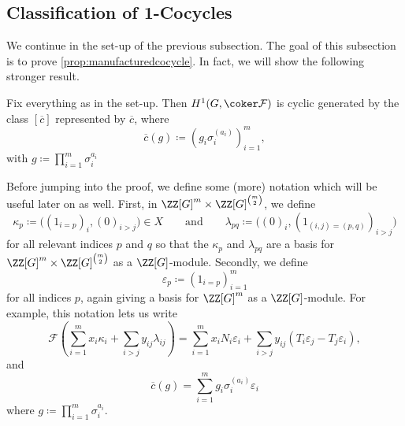 \documentclass{article}
\numberwithin{equation}{section}
\begin{document}
\subsection{Classification of 1-Cocycles}
We continue in the set-up of the previous subsection. The goal of this subsection is to prove \autoref{prop:manufacturedcocycle}. In fact, we will show the following stronger result.
\begin{proposition} \label{prop:allmanufacturedcocycles}
	Fix everything as in the set-up. Then $H^1(G,\coker\mathcal F)$ is cyclic generated by the class $[\overline c]$ represented by $\overline c$, where
	\[\overline c(g)\coloneqq\left(g_i\sigma_i^{(a_i)}\right)_{i=1}^m,\]
	with $g\coloneqq\prod_{i=1}^m\sigma_i^{a_i}$
\end{proposition}
Before jumping into the proof, we define some (more) notation which will be useful later on as well. First, in $\ZZ[G]^m\times\ZZ[G]^{\binom m2}$, we define
\[\kappa_p\coloneqq\big((1_{i=p})_i,(0)_{i>j}\big)\in X\qquad\text{and}\qquad\lambda_{pq}\coloneqq\big((0)_i,(1_{(i,j)=(p,q)})_{i>j}\big)\]
for all relevant indices $p$ and $q$ so that the $\kappa_p$ and $\lambda_{pq}$ are a basis for $\ZZ[G]^m\times\ZZ[G]^{\binom m2}$ as a $\ZZ[G]$-module. Secondly, we define
\[\varepsilon_p\coloneqq(1_{i=p})_{i=1}^m\]
for all indices $p$, again giving a basis for $\ZZ[G]^m$ as a $\ZZ[G]$-module. For example, this notation lets us write
\begin{equation}
	\mathcal F\left(\sum_{i=1}^mx_i\kappa_i+\sum_{i>j}y_{ij}\lambda_{ij}\right)=\sum_{i=1}^mx_iN_i\varepsilon_i+\sum_{i>j}y_{ij}(T_i\varepsilon_j-T_j\varepsilon_i), \label{eq:betterf}
\end{equation}
and
\[\overline c(g)=\sum_{i=1}^mg_i\sigma_i^{(a_i)}\varepsilon_i\]
where $g\coloneqq\prod_{i=1}^m\sigma_i^{a_i}$.
\end{document}
